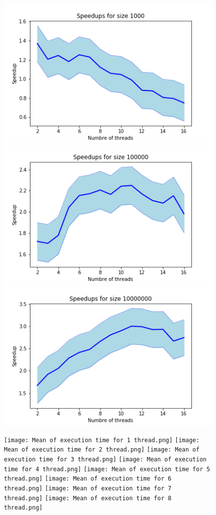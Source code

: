 \documentclass[a4paper,12pt]{article}
\begin{document}
    \begin{figure}[ht]
        \centering
        \includegraphics[width =0.55\linewidth]{Speedups for size 1000.png}
        \includegraphics[width =0.55\linewidth]{Speedups for size 100000.png}
        \includegraphics[width =0.55\linewidth]{Speedups for size 10000000.png}
    \end{figure}
    
    \begin{figure}[ht]
    \centering
        \texttt{[image: Mean of execution time for 1 thread.png]}
        \texttt{[image: Mean of execution time for 2 thread.png]}
        \texttt{[image: Mean of      execution time for 3         thread.png]}
        \texttt{[image: Mean of execution time for 4 thread.png]}
        \texttt{[image: Mean of      execution time for 5         thread.png]}
        \texttt{[image: Mean of execution time for 6 thread.png]}
        \texttt{[image: Mean of      execution time for 7         thread.png]}
        \texttt{[image: Mean of execution time for 8 thread.png]}
    \end{figure}
  
\end{document}
